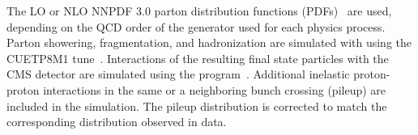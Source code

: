 The LO or NLO NNPDF 3.0 parton distribution functions (PDFs)~\cite{Ball:2014uwa} are 
used, depending on the QCD order of the generator used for each physics 
process. 
%
Parton showering, fragmentation, and hadronization are simulated with {\sc {}} using the CUETP8M1 tune~\cite{ue1,ue2}. 
%
Interactions of the resulting final state particles with the CMS detector are simulated using the \GEANTfour program~\cite{geant4}.
%
Additional inelastic proton-proton interactions in the same or a neighboring bunch crossing (pileup) are included in the simulation.
%
The pileup distribution is corrected to match the corresponding distribution observed in data. 
